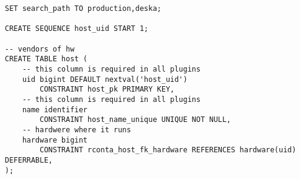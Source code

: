 \documentclass[deska]{subfiles}
\begin{document}
\begin{verbatim}
SET search_path TO production,deska;

CREATE SEQUENCE host_uid START 1;

-- vendors of hw
CREATE TABLE host (
    -- this column is required in all plugins
    uid bigint DEFAULT nextval('host_uid')
        CONSTRAINT host_pk PRIMARY KEY,
    -- this column is required in all plugins
    name identifier
        CONSTRAINT host_name_unique UNIQUE NOT NULL,
    -- hardwere where it runs
    hardware bigint
        CONSTRAINT rconta_host_fk_hardware REFERENCES hardware(uid) DEFERRABLE,
);
\end{verbatim}
\end{document}
